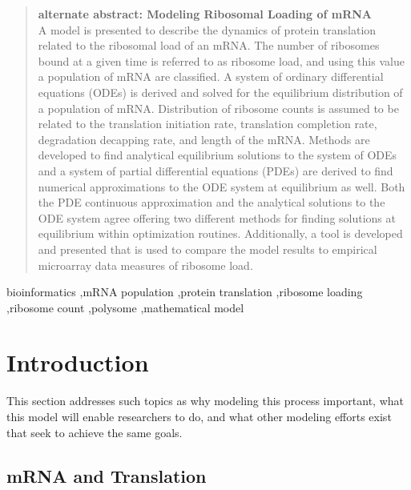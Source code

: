 \documentclass[review]{elsarticle}
\begin{document}
\begin{abstract}
\textbf{alternate abstract: Modeling Ribosomal Loading of mRNA}\\
A model is presented to describe the dynamics of protein translation related to the ribosomal load of an mRNA.
The number of ribosomes bound at a given time is referred to as ribosome load, and using this value a population of mRNA are classified.
A system of ordinary differential equations (ODEs) is derived and solved for the equilibrium distribution of a population of mRNA.
Distribution of ribosome counts is assumed to be related to the translation initiation rate, translation completion rate, degradation decapping rate, and length of the mRNA.
Methods are developed to find analytical equilibrium solutions to the system of ODEs and a system of partial differential equations (PDEs) are derived to find numerical approximations to the ODE system at equilibrium as well.
Both the PDE continuous approximation and the analytical solutions to the ODE system agree offering two different methods for finding solutions at equilibrium within optimization routines.
Additionally, a tool is developed and presented that is used to compare the model results to empirical microarray data measures of ribosome load.  
\end{abstract}
\begin{keyword}
bioinformatics \sep mRNA population \sep protein translation \sep ribosome loading \sep ribosome count \sep polysome \sep mathematical model
\end{keyword}
\maketitle
\newpage

\section{Introduction}
This section addresses such topics as why modeling this process important, what this model will enable researchers to do, and what other modeling efforts exist that seek to achieve the same goals.


\subsection{mRNA and Translation}\label{sec:Bioligical underpinnings}
\end{document}
